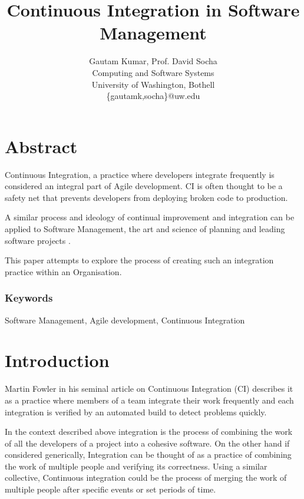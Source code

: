 \documentclass[12pt,conference]{IEEEtran}
\begin{document}
\title{Continuous Integration in Software Management}


\author{
{\rm Gautam Kumar, Prof. David Socha}\\
Computing and Software Systems\\
University of Washington, Bothell\\
\{gautamk,socha\}@uw.edu
} %

\maketitle
\thispagestyle{empty}


\section*{Abstract}
Continuous Integration, a practice where developers integrate 
frequently \cite{stahl_modeling_2014} is considered an integral part of Agile 
development. CI is often thought to be a safety net that prevents developers from deploying broken code to production. 

A similar process and ideology of continual improvement and integration can be applied to Software Management, the art and science of planning and leading software projects \cite{stellman_applied_2005}.

This paper attempts to explore the process of creating such an integration practice within an Organisation.

\subsubsection*{Keywords}

Software Management, Agile development, Continuous Integration

\section*{Introduction}

Martin Fowler in his seminal article \cite{fowler_continuous_2006} on Continuous Integration (CI) describes it as a practice where members of a team integrate their work frequently and each integration is verified by an automated build to detect problems quickly.

In the context described above integration is the process of combining the work of all the developers of a project into a cohesive software. On the other hand if considered generically, Integration can be thought of as a practice of combining the work of multiple people and verifying its correctness. Using a similar collective, Continuous integration could be the process of merging the work of multiple people after specific events or set periods of time.
\end{document}
